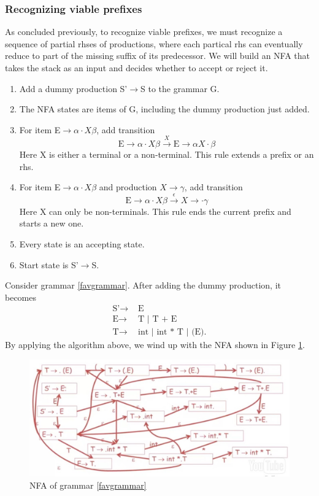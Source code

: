 \subsubsection{Recognizing viable prefixes}
As concluded previously, to recognize viable prefixes, we must recognize a sequence of partial rhses of productions, where each partical rhs can eventually reduce to part of the missing suffix of its predecessor. We will build an NFA that takes the stack as an input and decides whether to accept or reject it.
\begin{enumerate}
\item Add a dummy production S'$\rightarrow$S to the grammar G.
\item The NFA states are items of G, including the dummy production just added.
\item For item E$\rightarrow\alpha\cdot X\beta$, add transition
\begin{equation*}
\text{E}\rightarrow\alpha \cdot X\beta\xrightarrow{X}\text{E}\rightarrow\alpha X\cdot\beta
\end{equation*}
Here X is either a terminal or a non-terminal. This rule extends a prefix or an rhs.
\item For item E$\rightarrow\alpha\cdot X\beta$ and production $X\rightarrow\gamma$, add transition
\begin{equation*}
\text{E}\rightarrow\alpha \cdot X\beta\xrightarrow{\epsilon}X\rightarrow\cdot\gamma
\end{equation*}
Here X can only be non-terminals. This rule ends the current prefix and starts a new one.
\item Every state is an accepting state.
\item Start state is S'$\rightarrow$S. 
\end{enumerate}
Consider grammar \eqref{favgrammar}. After adding the dummy production, it becomes
\begin{equation*}\begin{split}
\text{S'}\rightarrow&\text{ E}\\
\text{E}\rightarrow&\text{ T }|\text{ T + E }\\\text{T}\rightarrow&\text{ int }|\text{ int * T }|\text{ (E).}
\end{split}\end{equation*}
By applying the algorithm above, we wind up with the NFA shown in Figure \ref{nfa}.
\begin{figure}[ht]
\centering
\includegraphics[width = \textwidth]{nfa.jpg}
\caption{NFA of grammar \eqref{favgrammar}}\label{nfa}
\end{figure}

